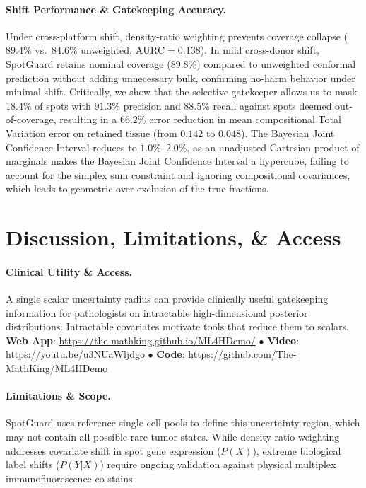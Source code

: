 \documentclass[pmlr,twocolumn,10pt]{jmlr}
\begin{document}
\paragraph{Shift Performance \& Gatekeeping Accuracy.}
Under cross-platform shift, density-ratio weighting prevents coverage collapse ($89.4\%$ vs.\ $84.6\%$ unweighted, $\text{AURC} = 0.138$). In mild cross-donor shift, SpotGuard retains nominal coverage ($89.8\%$) compared to unweighted conformal prediction without adding unnecessary bulk, confirming no-harm behavior under minimal shift. Critically, we show that the selective gatekeeper allows us to mask $18.4\%$ of spots with $91.3\%$ precision and $88.5\%$ recall against spots deemed out-of-coverage, resulting in a $66.2\%$ error reduction in mean compositional Total Variation error on retained tissue (from $0.142$ to $0.048$). The Bayesian Joint Confidence Interval reduces to $1.0\%$--$2.0\%$, as an unadjusted Cartesian product of marginals makes the Bayesian Joint Confidence Interval a hypercube, failing to account for the simplex sum constraint and ignoring compositional covariances, which leads to geometric over-exclusion of the true fractions.

\section{Discussion, Limitations, \& Access}
\label{sec:discussion}

\paragraph{Clinical Utility \& Access.}
A single scalar uncertainty radius can provide clinically useful gatekeeping information for pathologists on intractable high-dimensional posterior distributions. Intractable covariates motivate tools that reduce them to scalars.
\textbf{Web App}: \url{https://the-mathking.github.io/ML4HDemo/} $\bullet$ 
\textbf{Video}: \url{https://youtu.be/u3NUaWljdgo} $\bullet$ 
\textbf{Code}: \url{https://github.com/The-MathKing/ML4HDemo}

\paragraph{Limitations \& Scope.}
SpotGuard uses reference single-cell pools to define this uncertainty region, which may not contain all possible rare tumor states. While density-ratio weighting addresses covariate shift in spot gene expression ($P(X)$), extreme biological label shifts ($P(Y|X)$) require ongoing validation against physical multiplex immunofluorescence co-stains.

\newpage
\renewcommand{\bibfont}{\normalsize}
\setlength{\bibsep}{5pt plus 2ex}

\end{document}
